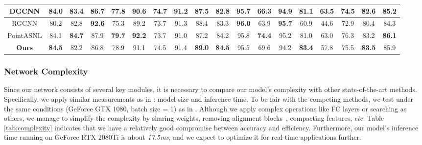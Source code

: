 \documentclass[journal,twoside]{IEEEtran}
\newcommand{\latinphrase}[1]{\textit{#1}}
\newcommand{\etc}{\latinphrase{etc.}\xspace}
\begin{document}
\begin{table*}
\begin{center}
{\begin{tabular}{||c| c c c c c c c c c c c c c c c c |c||}
DGCNN \cite{wang2019dynamic}  & 84.0   & 83.4 & 86.7  & 77.8  & 90.6  & 74.7    & 91.2  & 87.5  & 82.8     & 95.7  & 66.3  & 94.9   & 81.1  & \textbf{63.5}    & 74.5  & 82.6 & 85.2    \\ \hline
RGCNN \cite{te2018rgcnn}  & 80.2   & 82.8 & \textbf{92.6}  & 75.3  & 89.2  & 73.7    & 91.3  & 88.4  & 83.3     & \textbf{96.0}  & 63.9  & \textbf{95.7}   & 60.9  & 44.6    & 72.9  & 80.4 & 84.3    \\ \hline
PointASNL \cite{Yan_2020_CVPR} &84.1 &\textbf{84.7} &87.9 &\textbf{79.7} &\textbf{92.2} &73.7 &91.0 &87.2 &84.2 &95.8 &\textbf{74.4} &95.2 &81.0 &63.0 &76.3 &83.2 &\textbf{86.1}\\
\hline\hline
\textbf{Ours}  &\textbf{84.5} &82.2 &86.8 &78.9 &91.1 &74.5 &91.4 &\textbf{89.0} &\textbf{84.5} &95.5 &69.6 &94.2 &\textbf{83.4} &57.8 &75.5 &\textbf{83.5} &85.9   \\ \hline
\end{tabular}
\label{tab:seg}
}
\end{center}
\end{table*}

\subsubsection{Network Complexity}
Since our network consists of several key modules, it is necessary to compare our model's complexity with other state-of-the-art methods. Specifically, we apply similar measurements as in \cite{wang2019dynamic}: model size and inference time. To be fair with the competing methods, we test under the same conditions (GeForce GTX 1080, batch size = 1) as in \cite{wang2019dynamic}. Although we apply complex operations like FC layers or  searching as others, we manage to simplify the complexity by sharing weights, removing alignment blocks~\cite{qi2017pointnet,wang2019dynamic}, compacting features, \etc Table \ref{tab:complexity} indicates that we have a relatively good compromise between accuracy and efficiency. Furthermore, our model's inference time running on GeForce RTX 2080Ti is about \emph{17.5ms}, and we expect to optimize it for real-time applications further.
\end{document}
